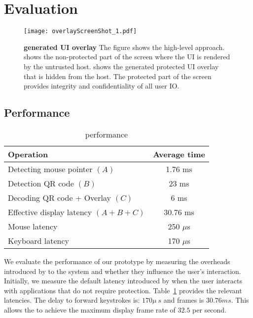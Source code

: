 \section{Evaluation}
\label{sec:eval}

\iffalse
\begin{figure}[t]
\centering
\texttt{[image: overlayScreenShot.pdf]}
\caption{\textbf{\name overlay}. }
\label{fig:screenshot_1}
\centering
\end{figure}
\fi


\begin{figure}[t]
\centering
\texttt{[image: overlayScreenShot\_1.pdf]}
\caption{\textbf{\device generated UI overlay} The figure shows the \name high-level approach. \one shows the non-protected part of the screen where the UI is rendered by the untrusted host. \two shows the \device generated protected UI overlay that is hidden from the host. The protected part of the screen provides integrity and confidentiality of all user IO.}
\spacesave
\label{fig:exampleImpelmentation}
\end{figure}




\subsection{Performance}


\begin{table}[t]
\centering
\begin{tabular}{l | c}
\textbf{Operation} & \textbf{Average time} \\\hline
Detecting mouse pointer $(A)$ & 1.76 ms \\
Detection QR code $(B)$ & 23 ms\\
Decoding QR code + Overlay $(C)$ & 6 ms\\
Effective display latency $(A+B+C)$ & 30.76 ms \\
Mouse latency & 250 $\mu$s\\
Keyboard latency & 170 $\mu$s\\\hline
\end{tabular} 
\caption{\device performance}\spacesave
\label{tab:performance}
\end{table}


We evaluate the performance of our prototype by measuring the overheads introduced by \name to the system and whether they influence the user's interaction. Initially, we measure the default latency introduced by \device when the user interacts with applications that do not require protection. Table~\ref{tab:performance} provides the relevant latencies.
The delay to forward keystrokes is: $170 \mu\ s$ and frames is $30.76 ms$. This allows the \device to achieve the maximum display frame rate of $32.5$ per second.

